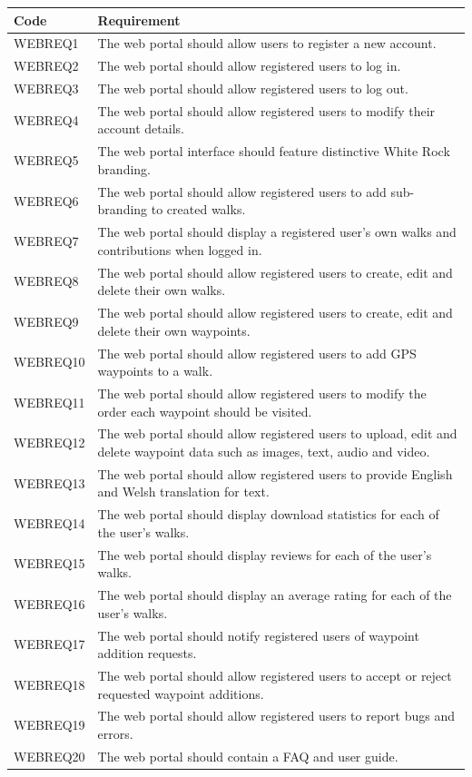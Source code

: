 \documentclass[11pt,a4paper]{article}
\begin{document}
\begin{longtable}{|p{2.5cm}p{13cm}|}
\hline
\textbf{Code} & \textbf{Requirement} \\
\hline
WEBREQ1 & The web portal should allow users to register a new account. \\ \hline
WEBREQ2 & The web portal should allow registered users to log in. \\ \hline
WEBREQ3 & The web portal should allow registered users to log out. \\ \hline
WEBREQ4 & The web portal should allow registered users to modify their account details. \\ \hline
WEBREQ5 & The web portal interface should feature distinctive White Rock branding. \\ \hline
WEBREQ6 & The web portal should allow registered users to add sub-branding to created walks. \\ \hline
WEBREQ7 & The web portal should display a registered user's own walks and contributions when logged in. \\ \hline
WEBREQ8 & The web portal should allow registered users to create, edit and delete their own walks. \\ \hline
WEBREQ9 & The web portal should allow registered users to create, edit and delete their own waypoints. \\ \hline
WEBREQ10 & The web portal should allow registered users to add GPS waypoints to a walk. \\ \hline
WEBREQ11 & The web portal should allow registered users to modify the order each waypoint should be visited. \\ \hline
WEBREQ12 & The web portal should allow registered users to upload, edit and delete waypoint data such as images, text, audio and video. \\ \hline
WEBREQ13 & The web portal should allow registered users to provide English and Welsh translation for text. \\ \hline
WEBREQ14 & The web portal should display download statistics for each of the user's walks. \\ \hline
WEBREQ15 & The web portal should display reviews for each of the user's walks. \\ \hline
WEBREQ16 & The web portal should display an average rating for each of the user's walks. \\ \hline
WEBREQ17 & The web portal should notify registered users of waypoint addition requests. \\ \hline
WEBREQ18 & The web portal should allow registered users to accept or reject requested waypoint additions. \\ \hline
WEBREQ19 & The web portal should allow registered users to report bugs and errors. \\ \hline
WEBREQ20 & The web portal should contain a FAQ and user guide. \\ \hline
\end{longtable}
\end{document}
